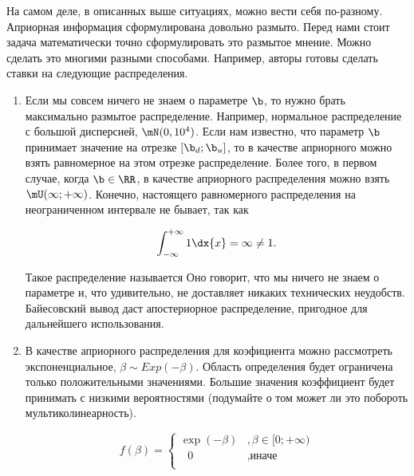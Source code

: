 \begin{problem}
\begin{sol}	
На самом деле, в описанных выше ситуациях, можно вести себя по-разному. Априорная информация сформулирована довольно размыто. Перед нами стоит задача математически точно сформулировать это размытое мнение. Можно сделать это многими разными способами. Например, авторы готовы сделать ставки на следующие распределения.

\begin{enumerate}

\item Если мы совсем ничего не знаем о параметре $\b$, то нужно брать максимально размытое распределение. Например, нормальное распределение с большой дисперсией, $\mN(0, 10^4)$. Если нам известно, что параметр $\b$ принимает значение на отрезке $[\b_d; \b_u]$, то в качестве априорного можно взять равномерное на этом отрезке распределение. Более того, в первом случае, когда $\b \in \RR$, в качестве априорного распределения можно взять $\mU(\infty; +\infty)$. Конечно, настоящего равномерного распределения на неограниченном интервале не бывает, так как 

\[ \int_{-\infty}^{+\infty} 1 \dx{x} = \infty \neq 1.\]

Такое распределение называется  Оно говорит, что мы ничего не знаем о параметре и, что удивительно, не доставляет никаких технических неудобств. Байесовский вывод даст апостериорное распределение, пригодное для дальнейшего использования.

\item В качестве априорного распределения для коэфициента можно рассмотреть экспоненциальное, $\beta \sim Exp(-\beta)$. Область определения будет ограничена только положительными значениями. Большие значения коэффициент будет принимать с низкими вероятностями (подумайте о том может ли это побороть мультиколинеарность).

\begin{figure}[H]
\begin{minipage}[H]{0.49\linewidth}
\begin{center}
\[ f(\beta) = \begin{cases}
\exp(-\beta)&, \beta \in [0;+\infty) \\
\mbox{ } 0&, \text{иначе}\\
\end{cases} \]
\end{center}
\end{minipage}
\hfill
\begin{minipage}[H]{0.49\linewidth}
\begin{center}
\end{center}
\end{minipage}
\end{figure}


\end{enumerate}
\end{sol}
\end{problem}
